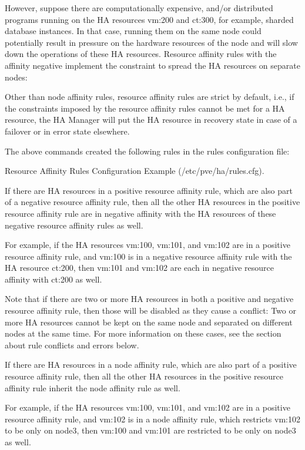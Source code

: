 However, suppose there are computationally expensive, and/or distributed programs running on the HA resources vm:200 and ct:300, for example, sharded database instances. In that case, running them on the same node could potentially result in pressure on the hardware resources of the node and will slow down the operations of these HA resources. Resource affinity rules with the affinity negative implement the constraint to spread the HA resources on separate nodes:

Other than node affinity rules, resource affinity rules are strict by default, i.e., if the constraints imposed by the resource affinity rules cannot be met for a HA resource, the HA Manager will put the HA resource in recovery state in case of a failover or in error state elsewhere.

The above commands created the following rules in the rules configuration file:

Resource Affinity Rules Configuration Example (/etc/pve/ha/rules.cfg).

If there are HA resources in a positive resource affinity rule, which are also part of a negative resource affinity rule, then all the other HA resources in the positive resource affinity rule are in negative affinity with the HA resources of these negative resource affinity rules as well.

For example, if the HA resources vm:100, vm:101, and vm:102 are in a positive resource affinity rule, and vm:100 is in a negative resource affinity rule with the HA resource ct:200, then vm:101 and vm:102 are each in negative resource affinity with ct:200 as well.

Note that if there are two or more HA resources in both a positive and negative resource affinity rule, then those will be disabled as they cause a conflict: Two or more HA resources cannot be kept on the same node and separated on different nodes at the same time. For more information on these cases, see the section about rule conflicts and errors below.

If there are HA resources in a node affinity rule, which are also part of a positive resource affinity rule, then all the other HA resources in the positive resource affinity rule inherit the node affinity rule as well.

For example, if the HA resources vm:100, vm:101, and vm:102 are in a positive resource affinity rule, and vm:102 is in a node affinity rule, which restricts vm:102 to be only on node3, then vm:100 and vm:101 are restricted to be only on node3 as well.

